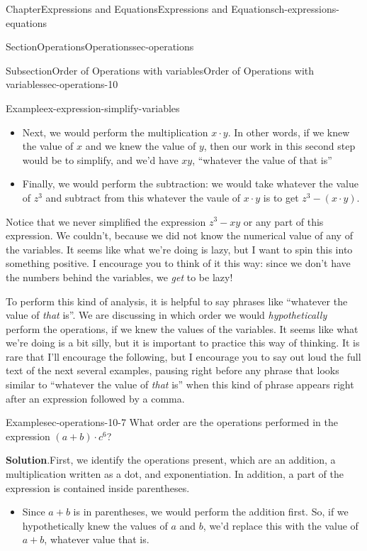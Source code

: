 \documentclass[twoside,11pt,]{book}
\newcommand{\blocktitlefont}{\relax}
\numberwithin{equation}{chapter}
\begin{document}
\begin{chapterptx}{Chapter}{Expressions and Equations}{}{Expressions and Equations}{}{}{ch-expressions-equations}
\begin{sectionptx}{Section}{Operations}{}{Operations}{}{}{sec-operations}
\begin{subsectionptx}{Subsection}{Order of Operations with variables}{}{Order of Operations with variables}{}{}{sec-operations-10}
\begin{example}{Example}{}{ex-expression-simplify-variables}
\begin{itemize}[label=\textbullet]
\item{}Next, we would perform the multiplication \(x \cdot y\). In other words, if we knew the value of \(x\) and we knew the value of \(y\), then our work in this second step would be to simplify, and we'd have \(xy\), ``whatever the value of that is''%
\item{}Finally, we would perform the subtraction: we would take whatever the value of \(z^3\) and subtract from this whatever the vaule of \(x \cdot y\) is to get \(z^3 - (x \cdot y)\).%
\end{itemize}
%
\end{example}
Notice that we never simplified the expression \(z^3 - xy\) or any part of this expression. We couldn't, because we did not know the numerical value of any of the variables. It seems like what we're doing is lazy, but I want to spin this into something positive. I encourage you to think of it this way: since we don't have the numbers behind the variables, we \emph{get} to be lazy!%
\par
To perform this kind of analysis, it is helpful to say phrases like ``whatever the value of \emph{that} is''. We are discussing in which order we would \emph{hypothetically} perform the operations, if we knew the values of the variables. It seems like what we're doing is a bit silly, but it is important to practice this way of thinking. It is rare that I'll encourage the following, but I encourage you to say out loud the full text of the next several examples, pausing right before any phrase that looks similar to ``whatever the value of \emph{that} is'' when this kind of phrase appears right after an expression followed by a comma.%
\begin{example}{Example}{}{sec-operations-10-7}%
What order are the operations performed in the expression \((a+b) \cdot c^6\)?%
\par\smallskip%
\noindent\textbf{\blocktitlefont Solution}.\hypertarget{sec-operations-10-7-2}{}\quad{}First, we identify the operations present, which are an addition, a multiplication written as a dot, and exponentiation. In addition, a part of the expression is contained inside parentheses.%
\par
%
\begin{itemize}[label=\textbullet]
\item{}Since \(a+b\) is in parentheses, we would perform the addition first. So, if we hypothetically knew the values of \(a\) and \(b\), we'd replace this with the value of \(a+b\), whatever value that is.%

\end{itemize}
\end{example}
\end{subsectionptx}
\end{sectionptx}
\end{chapterptx}
\end{document}
